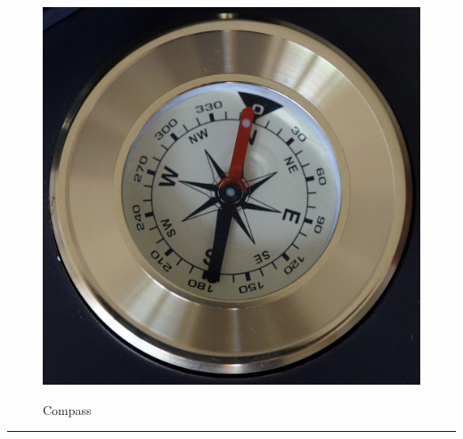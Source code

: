 \documentclass{article}
\begin{document}
    \begin{figure}[H]
        \centering
        \begin{minipage}{0.25\textwidth}
            \centering
            \includegraphics[width=\textwidth]{../SurvivalItemImages/compass}
        \end{minipage}\hfill
        \begin{minipage}{0.7\textwidth}
            \centering
            \Large Compass
        \end{minipage}
    \end{figure}
    \vspace{-0.8em}
    \noindent\rule{\textwidth}{0.4pt}
            
\end{document}
